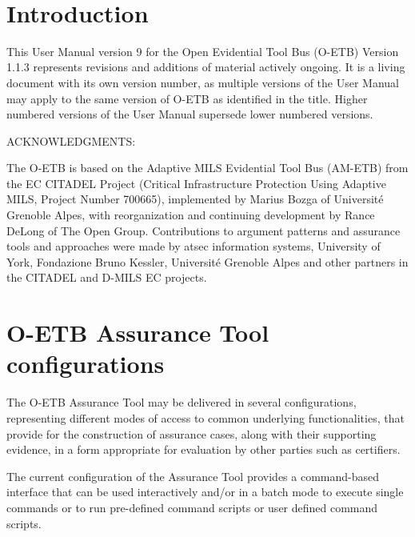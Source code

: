 \documentclass[12pt,twoside,a4paper]{article}
\begin{document}
\firstpage
\newpage
~

\newpage
\tableofcontents
\listoffigures
\listoftables
\clearpage
{}






\hypertarget{introduction}{%
\section{Introduction}\label{introduction}}

This User Manual version 9 for the Open Evidential Tool Bus (O-ETB) Version 1.1.3 represents revisions and additions of material actively ongoing. It is a living document with its own version number, as multiple versions of the User Manual may apply to the same version of O-ETB as identified in the title. Higher numbered versions of the User Manual supersede lower numbered versions.

ACKNOWLEDGMENTS:

The O-ETB is based on the Adaptive MILS Evidential Tool Bus (AM-ETB) from the EC CITADEL Project (Critical Infrastructure Protection Using Adaptive MILS, Project Number 700665), implemented by Marius Bozga of Université Grenoble Alpes, with reorganization and continuing development by Rance DeLong of The Open Group. Contributions to argument patterns and assurance tools and approaches were made by atsec information systems, University of York, Fondazione Bruno Kessler, Université Grenoble Alpes and other partners in the CITADEL and D-MILS EC projects.

\clearpage
\hypertarget{o-etb-assurance-tool-configurations}{%
\section{O-ETB Assurance Tool configurations}\label{o-etb-assurance-tool-configurations}}

The O-ETB Assurance Tool may be delivered in several configurations, representing different modes of access to common underlying functionalities, that provide for the construction of assurance cases, along with their supporting evidence, in a form appropriate for evaluation by other parties such as certifiers.

The current configuration of the Assurance Tool provides a command-based interface that can be used interactively and/or in a batch mode to execute single commands or to run pre-defined command scripts or user defined command scripts.
\end{document}
